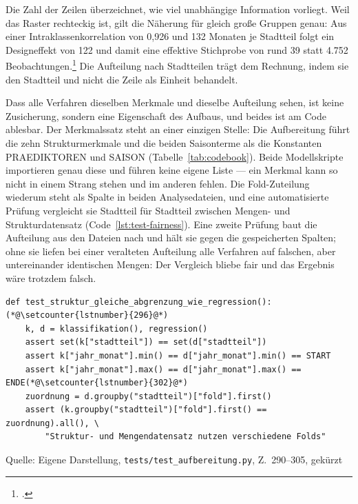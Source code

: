 \documentclass[12pt,a4paper]{article}
\newcommand{\tabquelle}[1][Eigene Darstellung]{%
  \par\setlength{\parskip}{0pt}\vspace{3pt}%
  {\setstretch{1}\fontsize{9pt}{11pt}\selectfont\raggedright Quelle: #1\par}%
}
\begin{document}
Die Zahl der Zeilen überzeichnet, wie viel unabhängige Information vorliegt.
Weil das Raster rechteckig ist, gilt die Näherung für gleich große Gruppen
genau: Aus einer Intraklassenkorrelation von 0,926 und 132 Monaten je
Stadtteil folgt ein Designeffekt von 122 und damit eine effektive Stichprobe
von rund 39 statt 4.752 Beobachtungen.\footcite[206]{Killip2004} Die
Aufteilung nach Stadtteilen trägt dem Rechnung, indem sie den Stadtteil und
nicht die Zeile als Einheit behandelt.
 
Dass alle Verfahren dieselben Merkmale und dieselbe Aufteilung sehen, ist keine
Zusicherung, sondern eine Eigenschaft des Aufbaus, und beides ist am Code
ablesbar. Der Merkmalssatz steht an einer einzigen Stelle: Die Aufbereitung führt die zehn Strukturmerkmale und die beiden Saisonterme als die Konstanten PRAEDIKTOREN und SAISON (Tabelle~\ref{tab:codebook}). Beide Modellskripte importieren genau diese und führen keine eigene Liste --- ein Merkmal kann so nicht in einem Strang stehen und im anderen fehlen. Die Fold-Zuteilung wiederum steht als
Spalte in beiden Analysedateien, und eine automatisierte Prüfung vergleicht sie
Stadtteil für Stadtteil zwischen Mengen- und Strukturdatensatz
(Code~\ref{lst:test-fairness}). Eine zweite Prüfung baut die Aufteilung
aus den Dateien nach und hält sie gegen die gespeicherten Spalten; ohne sie
liefen bei einer veralteten Aufteilung alle Verfahren auf falschen, aber
untereinander identischen Mengen: Der Vergleich bliebe fair und das Ergebnis
wäre trotzdem falsch.

\begin{quellcode}[htbp]
\caption{Beide Datensätze tragen dieselbe Fold-Zuordnung}
\label{lst:test-fairness}\vspace{-3.5pt}
\begin{lstlisting}[style=pythonstil,firstnumber=290]
def test_struktur_gleiche_abgrenzung_wie_regression():(*@\setcounter{lstnumber}{296}@*)
    k, d = klassifikation(), regression()
    assert set(k["stadtteil"]) == set(d["stadtteil"])
    assert k["jahr_monat"].min() == d["jahr_monat"].min() == START
    assert k["jahr_monat"].max() == d["jahr_monat"].max() == ENDE(*@\setcounter{lstnumber}{302}@*)
    zuordnung = d.groupby("stadtteil")["fold"].first()
    assert (k.groupby("stadtteil")["fold"].first() == zuordnung).all(), \
        "Struktur- und Mengendatensatz nutzen verschiedene Folds"
\end{lstlisting}
\tabquelle[Eigene Darstellung, \texttt{tests/test\_aufbereitung.py}, Z.~290--305, gekürzt]
\end{quellcode}
\end{document}
